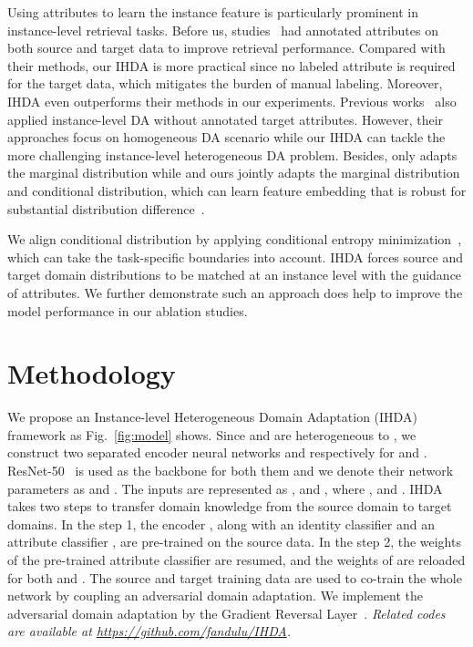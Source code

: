 \documentclass[journal]{IEEEtran}
\begin{document}
Using attributes to learn the instance feature is particularly prominent in instance-level retrieval tasks. Before us, studies~\cite{yu2016sketch,song2016deep,ouyang2016forgetmenot,liu2018deep} had annotated attributes on both source and target data to improve retrieval performance. Compared with their methods, our IHDA is more practical since no labeled attribute is required for the target data, which mitigates the burden of manual labeling. Moreover, IHDA even outperforms their methods in our experiments. Previous works~\cite{Lin2018multi,wang2018transferable} also applied instance-level DA without annotated target attributes. However, their approaches focus on homogeneous DA scenario while our IHDA can tackle the more challenging instance-level heterogeneous DA problem. Besides, \cite{wang2018transferable} only adapts the marginal distribution while \cite{Lin2018multi} and ours jointly adapts the marginal distribution and conditional distribution, which can learn feature embedding that is robust for substantial distribution difference~\cite{long2013transfer,saito2019semi}.

We align conditional distribution by applying conditional entropy minimization~\cite{grandvalet2005semi,saito2019semi}, which can take the task-specific boundaries into account. IHDA forces source and target domain distributions to be matched at an instance level with the guidance of attributes. We further demonstrate such an approach does help to improve the model performance in our ablation studies.


\section{Methodology}
\label{sec:methodology}

We propose an Instance-level Heterogeneous Domain Adaptation (IHDA) framework as Fig.~\ref{fig:model} shows. Since  and  are heterogeneous to , we construct two separated encoder neural networks  and  respectively for  and . ResNet-50~\cite{he2016deep} is used as the backbone for both them and we denote their network parameters as  and . The inputs are represented as ,  and , where ,  and . IHDA takes two steps to transfer domain knowledge from the source domain to target domains. In the step 1, the encoder , along with an identity classifier  and an attribute classifier , are pre-trained on the source data. In the step 2, the weights of the pre-trained attribute classifier are resumed, and the weights of  are reloaded for both  and . The source and target training data are used to co-train the whole network by coupling an adversarial domain adaptation. We implement the adversarial domain adaptation by the Gradient Reversal Layer~\cite{ganin2015unsupervised}. \emph{Related codes are available at \url{https://github.com/fandulu/IHDA}.}
\end{document}
